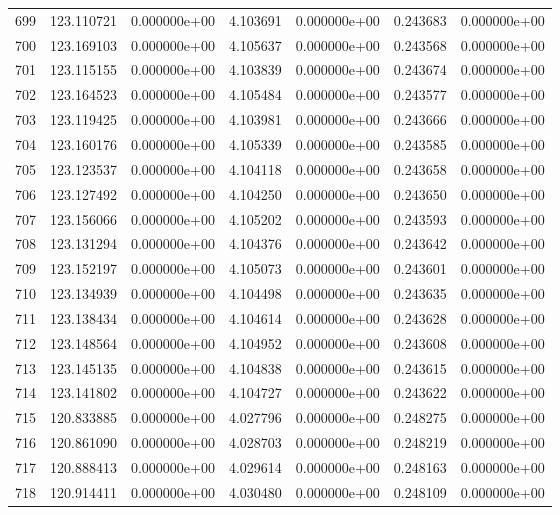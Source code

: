 \begin{tabular}{rrrrrrr}
 699 & 123.110721 &  0.000000e+00 &  4.103691 &  0.000000e+00 &   0.243683 &  0.000000e+00 \\
 700 & 123.169103 &  0.000000e+00 &  4.105637 &  0.000000e+00 &   0.243568 &  0.000000e+00 \\
 701 & 123.115155 &  0.000000e+00 &  4.103839 &  0.000000e+00 &   0.243674 &  0.000000e+00 \\
 702 & 123.164523 &  0.000000e+00 &  4.105484 &  0.000000e+00 &   0.243577 &  0.000000e+00 \\
 703 & 123.119425 &  0.000000e+00 &  4.103981 &  0.000000e+00 &   0.243666 &  0.000000e+00 \\
 704 & 123.160176 &  0.000000e+00 &  4.105339 &  0.000000e+00 &   0.243585 &  0.000000e+00 \\
 705 & 123.123537 &  0.000000e+00 &  4.104118 &  0.000000e+00 &   0.243658 &  0.000000e+00 \\
 706 & 123.127492 &  0.000000e+00 &  4.104250 &  0.000000e+00 &   0.243650 &  0.000000e+00 \\
 707 & 123.156066 &  0.000000e+00 &  4.105202 &  0.000000e+00 &   0.243593 &  0.000000e+00 \\
 708 & 123.131294 &  0.000000e+00 &  4.104376 &  0.000000e+00 &   0.243642 &  0.000000e+00 \\
 709 & 123.152197 &  0.000000e+00 &  4.105073 &  0.000000e+00 &   0.243601 &  0.000000e+00 \\
 710 & 123.134939 &  0.000000e+00 &  4.104498 &  0.000000e+00 &   0.243635 &  0.000000e+00 \\
 711 & 123.138434 &  0.000000e+00 &  4.104614 &  0.000000e+00 &   0.243628 &  0.000000e+00 \\
 712 & 123.148564 &  0.000000e+00 &  4.104952 &  0.000000e+00 &   0.243608 &  0.000000e+00 \\
 713 & 123.145135 &  0.000000e+00 &  4.104838 &  0.000000e+00 &   0.243615 &  0.000000e+00 \\
 714 & 123.141802 &  0.000000e+00 &  4.104727 &  0.000000e+00 &   0.243622 &  0.000000e+00 \\
 715 & 120.833885 &  0.000000e+00 &  4.027796 &  0.000000e+00 &   0.248275 &  0.000000e+00 \\
 716 & 120.861090 &  0.000000e+00 &  4.028703 &  0.000000e+00 &   0.248219 &  0.000000e+00 \\
 717 & 120.888413 &  0.000000e+00 &  4.029614 &  0.000000e+00 &   0.248163 &  0.000000e+00 \\
 718 & 120.914411 &  0.000000e+00 &  4.030480 &  0.000000e+00 &   0.248109 &  0.000000e+00 \\

\end{tabular}
